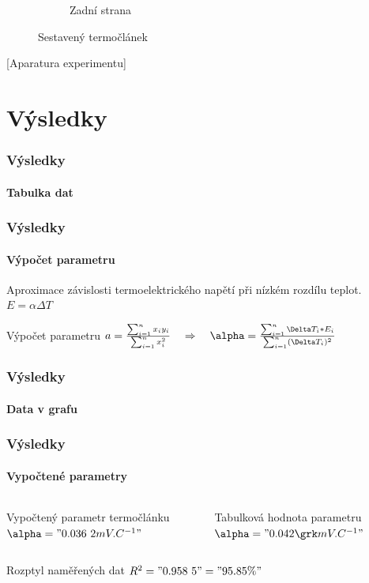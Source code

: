 \documentclass[smaller,aspectratio=1610,handout]{beamer}
\newcommand\sumi{\sum_{i=1}^n}
\begin{document}
\begin{frame}
\begin{figure}[htpb]
\begin{subfigure}{0.48\textwidth}
			\caption{Zadní strana}
		\end{subfigure}
		\hfill
		\caption{Sestavený termočlánek}
		\label{fig:termoclanek}
	\end{figure}
\end{frame}

\begin{frame}
	[Aparatura experimentu]
\end{frame}

\section{Výsledky}

\begin{frame}
	\frametitle{Výsledky}
	\framesubtitle{Tabulka dat}
	\hspace{0cm}\vfill
	\footnotesize
	
	\vfill
\end{frame}

\begin{frame}
	\frametitle{Výsledky}
	\framesubtitle{Výpočet parametru}
	\begin{block}{Aproximace závislosti termoelektrického napětí při nízkém rozdílu teplot.}
		\centering $E=\alpha\Delta T$
	\end{block}
	\begin{block}{Výpočet parametru}
		\centering $a=\frac{\sumi x_iy_i}{\sumi x_i^2}
		\ztoho \alpha=\frac{\sumi\Delta T_i*E_i}{\sumi (\Delta T_i)^2}$
	\end{block}
\end{frame}

\begin{frame}
	\frametitle{Výsledky}
	\framesubtitle{Data v grafu}
	\hspace{0cm}\vfill
	\small
	\vfill
\end{frame}

\begin{frame}
	\frametitle{Výsledky}
	\framesubtitle{Vypočtené parametry}
	\begin{columns}
		\begin{column}{0.46\textwidth}
			\begin{block}{Vypočtený parametr termočlánku}
				\centering $\alpha = "0.036~2 mV.C^{-1}"$
			\end{block}
		\end{column}
		\begin{column}{0.46\textwidth}
			\begin{block}{Tabulková hodnota parametru}
				\centering $\alpha = "0.042 \micro V.C^{-1}"$
			\end{block}
		\end{column}
	\end{columns}
	\begin{block}{Rozptyl naměřených dat}
		\centering $R^2="0.958~5"="95.85 \%"$
	\end{block}
\end{frame}
\end{document}
